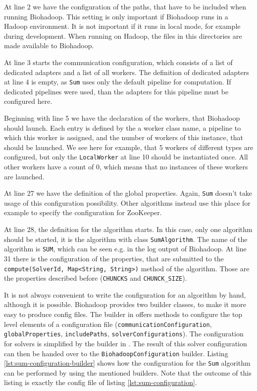   
  
  At line 2 we have the configuration of the paths, that have to be included when running Biohadoop. This setting is only important if Biohadoop runs in a Hadoop environment. It is not important if it runs in local mode, for example during development. When running on Hadoop, the files in this directories are made available to Biohadoop.
  
  At line 3 starts the communication configuration, which consists of a list of dedicated adapters and a list of all workers. The definition of dedicated adapters at line 4 is empty, as \texttt{Sum} uses only the default pipeline for computation. If dedicated pipelines were used, than the adapters for this pipeline must be configured here.
  
  Beginning with line 5 we have the declaration of the workers, that Biohadoop should launch. Each entry is defined by the a worker class name, a pipeline to which this worker is assigned, and the number of workers of this instance, that should be launched. We see here for example, that 5 workers of different types are configured, but only the \texttt{LocalWorker} at line 10 should be instantiated once. All other workers have a count of 0, which means that no instances of these workers are launched.
  
  At line 27 we have the definition of the global properties. Again, \texttt{Sum} doesn't take usage of this configuration possibility. Other algorithms instead use this place for example to specify the configuration for ZooKeeper.
  
  At line 28, the definition for the algorithm starts. In this case, only one algorithm should be started, it is the algorithm with class \texttt{SumAlgorithm}. The name of the algorithm is \texttt{SUM}, which can be seen e.g. in the log output of Biohadoop. At line 31 there is the configuration of the properties, that are submitted to the \texttt{compute(SolverId, Map<String, String>)} method of the algorithm. Those are the properties described before (\texttt{CHUNCKS} and \texttt{CHUNCK\_SIZE}).
 
  It is not always convenient to write the configuration for an algorithm by hand, although it is possible. Biohadoop provides two builder classes, to make it more easy to produce config files. The builder in  offers methods to configure the top level elements of a configuration file (\texttt{communicationConfiguration}, \texttt{globalProperties}, \texttt{includePaths}, \texttt{solverConfigurations}). The configuration for solvers is simplified by the builder in . The result of this solver configuration can then be handed over to the \texttt{BiohadoopConfiguration} builder. Listing \ref{lst:sum-configuration-builder} shows how the configuration for the \texttt{Sum} algorithm can be performed by using the mentioned builders. Note that the outcome of this listing is exactly the config file of listing \ref{lst:sum-configuration}.
  
